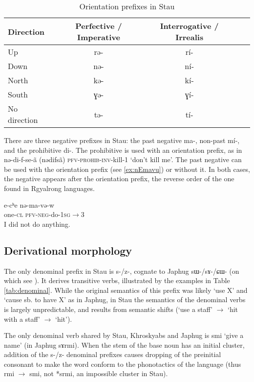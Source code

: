\documentclass[oneside,a4paper,11pt]{article}
\newcommand{\ipa}[1]{{\phon #1}} %
\begin{document}
\begin{table}[h]
\caption{Orientation prefixes in Stau} 
\label{tab:dir.pref} \centering
\begin{tabular}{lcccc}
\toprule
Direction & Perfective / Imperative & Interrogative / Irrealis \\
\midrule
 Up & \ipa{rə-} & \ipa{rí-} \\
Down & \ipa{nə-} & \ipa{ní-} \\
North  & \ipa{kə-} & \ipa{kí-} \\
South & \ipa{ɣə-} & \ipa{ɣí-} \\
No direction & \ipa{tə-} & \ipa{tí-} \\
\bottomrule
\end{tabular}
\end{table}

There are three negative prefixes in Stau: the past negative \ipa{ma-}, non-past \ipa{mí-}, and the prohibitive \ipa{di-}. The prohibitive is used with an orientation prefix, as in \ipa{nə-di-f-se-ã}  (\ipa{nədifsã}) \textsc{pfv-prohib-inv}-kill-1 `don't kill me'. The past negative can be used with the orientation prefix (see \ref{ex:nEmavu}) or without it. In both cases, the negative appears after the orientation prefix, the reverse order of the one found in Rgyalrong languages.


\begin{exe}
\ex \label{ex:nEmavu} 
\gll
\ipa{e-cʰe} 	\ipa{nə-ma-və-w}  \\
one-\textsc{cl} \textsc{pfv-neg}-do-\textsc{1sg}$\rightarrow$3 \\
\glt I did not do anything.
\end{exe}


 \subsection{Derivational morphology}
 
The only denominal prefix in Stau is \ipa{s-/z-}, cognate to Japhug \ipa{sɯ-/sɤ-/ɕɯ-} (on which see \citealt[14-17]{jacques14antipassive}). It derives transitive verbs, illustrated by the examples in Table \ref{tab:denominal}. While the original semantics of this prefix was likely `use X' and `cause sb. to have X' as in Japhug, in Stau the semantics of the denominal verbs is largely unpredictable, and results from semantic shifts (`use a staff' $\rightarrow$ `hit with a staff' $\rightarrow$  `hit'). 

The only denominal verb shared by Stau, Khroskyabs and Japhug is \ipa{smi} `give a name' (in Japhug \ipa{sɤrmi}). When the stem of the base noun has an initial cluster, addition of the \ipa{s-/z-} denominal prefixes causes dropping of the preinitial consonant to make the word conform to the phonotactics of the language (thus \ipa{rmi} $\rightarrow$ \ipa{smi}, not *\ipa{srmi}, an impossible cluster in Stau). 
\end{document}
